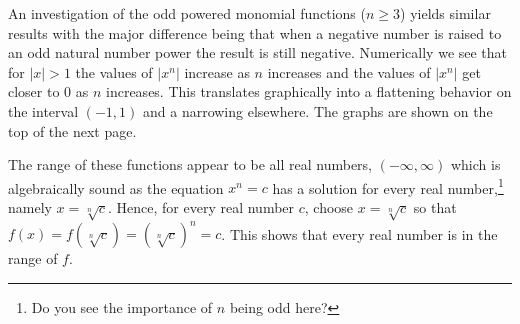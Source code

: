 \medskip

An investigation of the odd powered monomial functions ($n \geq 3$) yields similar results with the major difference being that when a negative number is raised to an odd natural number power the result is still negative.  Numerically we see that for $|x| > 1$ the values of $|x^n|$ increase as $n$ increases and the values of $|x^n|$ get closer to $0$ as $n$ increases.  This translates graphically into a flattening behavior on the interval $(-1, 1)$ and a narrowing elsewhere.  The graphs are shown on the top of the next page.

\medskip

The range of these functions appear to be all real numbers, $(-\infty, \infty)$ which is algebraically sound as the equation $x^n = c$ has a solution for every real number,\footnote{Do you see the importance of $n$ being odd here?} namely $x = \sqrt[n]{c}$.  Hence, for every real number $c$,  choose $x = \sqrt[n]{c}$ so that $f(x) = f(\sqrt[n]{c}) = (\sqrt[n]{c})^n =c$.  This shows that every real number is in the range of $f$.

